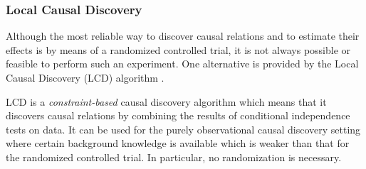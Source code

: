 \subsubsection{Local Causal Discovery}
Although the most reliable way to discover causal relations and to estimate their effects
is by means of a randomized controlled trial, it is not always possible or feasible to 
perform such an experiment. One alternative is provided by the Local Causal Discovery
(LCD) algorithm \cite{Cooper1997}.

LCD is a \emph{constraint-based} causal discovery algorithm which means that it discovers
causal relations by combining the results of conditional independence tests on data.
It can be used for the purely observational causal discovery setting where certain background knowledge is available
which is weaker than that for the randomized controlled trial. In particular, no randomization is necessary.

